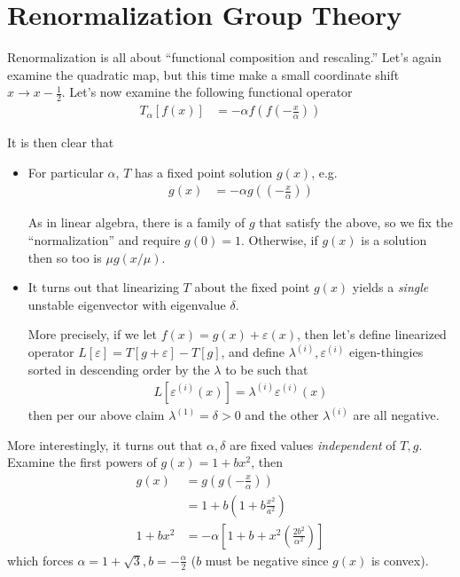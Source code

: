 \documentclass[10pt]{article}
\begin{document}
\clearpage
\section{Renormalization Group Theory}

Renormalization is all about ``functional composition and rescaling.'' Let's
again examine the quadratic map, but this time make a small coordinate shift
$x \to x - \frac{1}{2}$. Let's now examine the following functional operator
\begin{align}
    T_\alpha[f(x)] &= -\alpha f\left( f\left( -\frac{x}{\alpha} \right) \right)
\end{align}

It is then clear that
\begin{itemize}
    \item For particular $\alpha$, $T$ has a fixed point solution $g(x)$, e.g.
        \begin{align}
            g(x) &= -\alpha g\left( \left( -\frac{x}{\alpha} \right) \right)
        \end{align}

        As in linear algebra, there is a family of $g$ that satisfy the above,
        so we fix the ``normalization'' and require $g(0) = 1$. Otherwise, if
        $g(x)$ is a solution then so too is $\mu g(x/\mu)$.

    \item It turns out that linearizing $T$ about the fixed point $g(x)$ yields
        a \emph{single} unstable eigenvector with eigenvalue $\delta$.

        More precisely, if we let $f(x) = g(x) + \varepsilon(x)$, then let's define
        linearized operator $L[\varepsilon] = T[g+\varepsilon] - T[g]$, and define
        $\lambda^{(i)}, \varepsilon^{(i)}$ eigen-thingies sorted in descending order
        by the $\lambda$ to be such that
        \begin{align}
            L[\varepsilon^{(i)}(x)] = \lambda^{(i)}\varepsilon^{(i)}(x)
        \end{align}
        then per our above claim $\lambda^{(1)} = \delta > 0$ and the other
        $\lambda^{(i)}$ are all negative.
\end{itemize}

More interestingly, it turns out that $\alpha, \delta$ are fixed values
\emph{independent} of $T, g$. Examine the first powers of $g(x) = 1 + bx^2$,
then
\begin{align}
    g(x) &= g\left( g\left( -\frac{x}{\alpha} \right) \right)\\
    &= 1 + b\left( 1 + b\frac{x^2}{a^2} \right)\\
    1 + bx^2 &= -\alpha
    \left[
        1 + b + x^2\left( \frac{2b^2}{\alpha^2} \right)
    \right]
\end{align}
which forces $\alpha = 1 + \sqrt{3}, b = -\frac{\alpha}{2}$ ($b$ must be
negative since $g(x)$ is convex).
\end{document}
